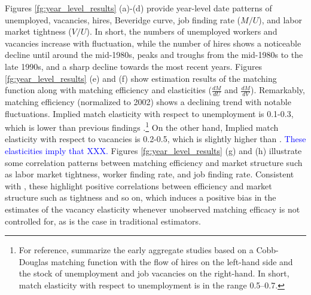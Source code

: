 \documentclass[12pt]{article}
\begin{document}
Figures \ref{fg:year_level_results} (a)-(d) provide year-level date patterns of unemployed, vacancies, hires, Beveridge curve, job finding rate ($M/U$), and labor market tightness ($V/U$). 
In short, the numbers of unemployed workers and vacancies increase with fluctuation, while the number of hires shows a noticeable decline until around the mid-1980s, peaks and troughs from the mid-1980s to the late 1990s, and a sharp decline towards the most recent years.
Figures \ref{fg:year_level_results} (e) and (f) show estimation results of the matching function along with matching efficiency and elasticities ($\frac{dM}{dU}$ and $\frac{dM}{dV}$).
Remarkably, matching efficiency (normalized to 2002) shows a declining trend with notable fluctuations.
Implied match elasticity with respect to unemployment is 0.1-0.3, which is lower than previous findings \citep{petrongolo2001looking}.\footnote{For reference, \cite{petrongolo2001looking} summarize the early aggregate studies based on a Cobb-Douglas matching function with the flow of hires on the left-hand side and the stock of unemployment and job vacancies on the right-hand. In short, match elasticity with respect to unemployment is in the range 0.5–0.7.} 
On the other hand, Implied match elasticity with respect to vacancies is 0.2-0.5, which is slightly higher than \cite{lange2020beyond}.
\textcolor{blue}{These elasticities imply that XXX.}
Figures \ref{fg:year_level_results} (g) and (h) illustrate some correlation patterns between matching efficiency and market structure such as labor market tightness, worker finding rate, and job finding rate.
Consistent with \cite{lange2020beyond}, these highlight positive correlations between efficiency and market structure such as tightness and so on, which induces a positive bias in the estimates of the vacancy elasticity whenever unobserved matching efficacy is not controlled for, as is the case in traditional estimators.
\end{document}
